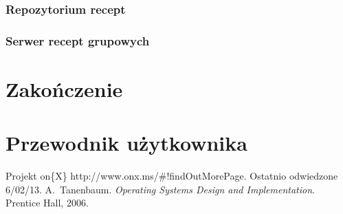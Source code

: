 \documentclass[11pt,a4paper,polish,thesis]{dcsbook}
\begin{document}
\subsection{Repozytorium recept}
\subsection{Serwer recept grupowych}

\chapter{Zakończenie}

\appendix

\chapter{Przewodnik użytkownika}

\backmatter

\begin{thebibliography}{1}
Projekt on\{X\} http://www.onx.ms/\#!findOutMorePage. Ostatnio odwiedzone 6/02/13.
A.~Tanenbaum. \emph{Operating Systems Design and Implementation}. Prentice Hall, 2006.
\end{thebibliography}
\end{document}
